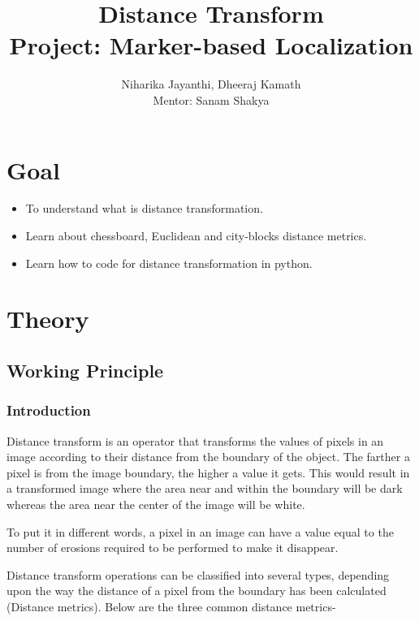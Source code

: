 \documentclass[]{article}
\date{}
\providecommand{\tightlist}{%
  \setlength{\itemsep}{0pt}\setlength{\parskip}{0pt}}
\begin{document}
	\title{\huge\textbf{Distance Transform}\LARGE \\Project: Marker-based Localization}
	\author{Niharika Jayanthi, Dheeraj Kamath \\Mentor: Sanam Shakya}
	\maketitle
	\pagebreak
\section{Goal}\label{goal}

\begin{itemize}
\tightlist
\item
  To understand what is distance transformation.
\item
  Learn about chessboard, Euclidean and city-blocks distance metrics.
\item
  Learn how to code for distance transformation in python.
\end{itemize}

\section{Theory}\label{theory}

\subsection{Working Principle}\label{working-principle}

\subsubsection{Introduction}\label{introduction}

Distance transform is an operator that transforms the values of pixels
in an image according to their distance from the boundary of the object.
The farther a pixel is from the image boundary, the higher a value it
gets. This would result in a transformed image where the area near and
within the boundary will be dark whereas the area near the center of the
image will be white.

To put it in different words, a pixel in an image can have a value equal
to the number of erosions required to be performed to make it disappear.

Distance transform operations can be classified into several types,
depending upon the way the distance of a pixel from the boundary has
been calculated (Distance metrics). Below are the three common distance
metrics-
\end{document}
